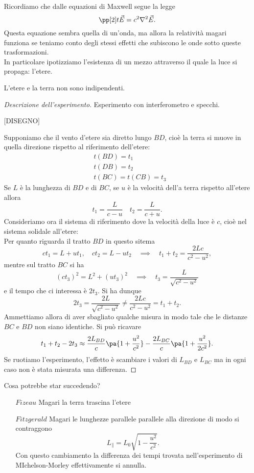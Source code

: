 \noindent Ricordiamo che dalle equazioni di Maxwell segue la legge
\[\pp[2]t{\vec E}=c^2\nabla^2\vec E.\]
Questa equazione sembra quella di un'onda, ma allora la relativit\`a magari funziona se teniamo conto degli stessi effetti che subiscono le onde sotto queste trasformazioni.\\
In particolare ipotizziamo l'esistenza di un mezzo attraverso il quale la luce si propaga: l'etere.

\begin{fact}
L'etere e la terra non sono indipendenti.
\end{fact}
\begin{proof}[Descrizione dell'esperimento]
Esperimento con interferometro e specchi.

[DISEGNO]

Supponiamo che il vento d'etere sia diretto lungo $BD$, cio\`e la terra si muove in quella direzione rispetto al riferimento dell'etere:
\begin{align*}
&t(BD)=t_1\\
&t(DB)=t_2\\
&t(BC)=t(CB)=t_3
\end{align*}
Se $L$ \`e la lunghezza di $BD$ e di $BC$, se $u$ \`e la velocit\`a dell'a terra rispetto all'etere allora
\[t_1=\frac L{c-u}\quad t_2=\frac L{c+u}.\]
Consideriamo ora il sistema di riferimento dove la velocit\`a della luce \`e $c$, cio\`e nel sistema solidale all'etere:\\
Per quanto riguarda il tratto $BD$ in questo sitema 
\[ct_1=L+ut_1,\quad ct_2=L-ut_2\quad\implies\quad t_1+t_2=\frac{2Lc}{c^2-u^2},\]
mentre sul tratto $BC$ si ha
\[(ct_3)^2=L^2+(ut_3)^2\quad\implies\quad t_3=\frac L{\sqrt{c^2-u^2}}\]
e il tempo che ci interessa \`e $2t_3$. Si ha dunque
\[2t_3=\frac{2L}{\sqrt{c^2-u^2}}\neq \frac{2Lc}{c^2-u^2}=t_1+t_2.\]
Ammettiamo allora di aver sbagliato qualche misura in modo tale che le distanze $BC$ e $BD$ non siano identiche. Si pu\`o ricavare
\[t_1+t_2-2t_3\approx \frac{2L_{BD}}c\pa{1+\frac{u^2}{c^2}}-\frac{2L_{BC}}c\pa{1+\frac{u^2}{2c^2}}.\]
Se ruotiamo l'esperimento, l'effetto \`e scambiare i valori di $L_{BD}$ e $L_{BC}$ ma in ogni caso non \`e stata misurata una differenza.
\end{proof}
\noindent
Cosa potrebbe star succedendo?
\setlength{\leftmargini}{0cm}
\begin{enumerate}
\item[$\boxed{Fizeau}$] Magari la terra trascina l'etere
\item[$\boxed{Fitzgerald}$] Magari le lunghezze parallele parallele alla direzione di modo si contraggono
\[L_{\parallel}=L_0\sqrt{1-\frac{u^2}{c^2}}.\]
Con questo cambiamento la differenza dei tempi trovata nell'esperimento di MIchelson-Morley effettivamente si annulla. 
\end{enumerate}
\setlength{\leftmargini}{0.5cm}

